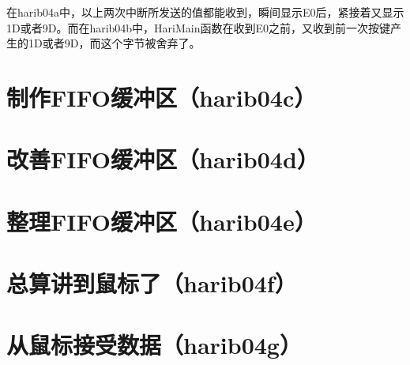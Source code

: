 在harib04a中，以上两次中断所发送的值都能收到，瞬间显示E0后，紧接着又显示1D或者9D。而在harib04b中，HariMain函数在收到E0之前，又收到前一次按键产生的1D或者9D，而这个字节被舍弃了。

\section{	制作FIFO缓冲区（harib04c）	}
\section{	改善FIFO缓冲区（harib04d）	}
\section{	整理FIFO缓冲区（harib04e）	}
\section{	总算讲到鼠标了（harib04f）	}
\section{	从鼠标接受数据（harib04g）	}

